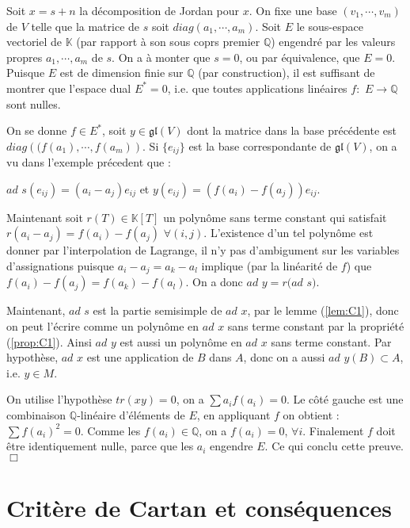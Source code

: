 \documentclass[a4paper,openany,12pt]{report}
\newcommand{\KK}{\mathbb{K}}
\newcommand{\QQ}{\mathbb{Q}}
\newcommand{\gl}{\mathfrak{gl}}
\theoremstyle{break}
{\theorembodyfont{\upshape}
\newtheorem*{rmq}{Remarque :}
\newtheorem*{prv}{Preuve :}
\newtheorem*{ex}{Exemples :}
\newtheorem{exe}{Exemple : }
\newtheorem*{nota}{Notation :}}
\begin{document}
\begin{prv}
\quad Soit $x=s+n$ la décomposition de Jordan pour $x$. On fixe une base $(v_{1},\cdots,v_{m})$ de $V$ telle que la matrice de $s$ soit $diag(a_{1}, \cdots,a_{m})$. Soit $E$ le sous-espace vectoriel de $\KK$ (par rapport à son sous coprs premier $\QQ$) engendré par les valeurs propres $a_{1},\cdots,a_{m}$ de $s$. On a à monter que $s=0$, ou par équivalence, que $E=0$. Puisque $E$ est de dimension finie sur $\QQ$ (par construction), il est suffisant de montrer que l'espace dual $E^{*}=0$, i.e. que toutes applications linéaires $f:$ $E \to \QQ$ sont nulles. 

On se donne $f \in E^{*}$, soit $y \in \gl(V)$ dont la matrice dans la base précédente est $diag\left( (f(a_{1}),\cdots,f(a_{m}) \right)$. Si $\{ e_{ij} \}$ est la base correspondante de $\gl(V)$, on a vu dans l'exemple précedent que :
\begin{center}
$ad$ $s(e_{ij}) = (a_{i} - a_{j})e_{ij}$ et $y(e_{ij}) = (f(a_{i})-f(a_{j}))e_{ij}$.
\end{center}
Maintenant soit $r(T) \in \KK[T]$ un polynôme sans terme constant qui satisfait $r(a_{i}-a_{j}) = f(a_{i})-f(a_{j})$ $\forall (i,j)$. L’existence d'un tel polynôme est donner par l’interpolation de Lagrange, il n'y pas d’ambigument sur les variables d'assignations puisque $a_{i} - a_{j} = a_{k} -a_{l}$ implique (par la linéarité de $f$) que $f(a_{i}) - f(a_{j}) = f(a_{k}) -f(a_{l})$. On a donc $ad$ $y= r(ad$ $s)$.

Maintenant, $ad$ $s$ est la partie semisimple de $ad$ $x$, par le lemme (\ref{lem:C1}), donc on peut l'écrire comme un polynôme en $ad$ $x$ sans terme constant par la propriété (\ref{prop:C1}). Ainsi $ad$ $y$ est aussi un polynôme en $ad$ $x$ sans terme constant. Par hypothèse, $ad$ $x$ est une application de $B$ dans $A$, donc on a aussi $ad$ $y(B) \subset A$, i.e. $y \in M$.

On utilise l'hypothèse $tr(xy)=0$, on a $\sum a_{i}f(a_{i}) = 0$. Le côté gauche est une combinaison $\QQ$-linéaire d'éléments de $E$, en appliquant $f$ on obtient : $\sum f(a_{i})^2 = 0$. Comme les $f(a_{i}) \in \QQ$, on a $f(a_{i})=0$, $\forall i$. Finalement $f$ doit être identiquement nulle, parce que les $a_{i}$ engendre $E$. Ce qui conclu cette preuve. $\Box$
\end{prv}

\section{Critère de Cartan et conséquences}
\end{document}
